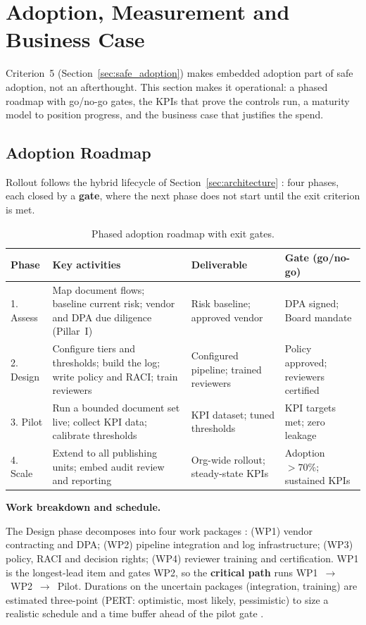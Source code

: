 \documentclass[12pt,a4paper]{article}
\begin{document}
\section{Adoption, Measurement and Business Case}
\label{sec:adoption}

Criterion~5 (Section~\ref{sec:safe_adoption}) makes embedded adoption part of safe adoption, not an afterthought. This section makes it operational: a phased roadmap with go/no-go gates, the KPIs that prove the controls run, a maturity model to position progress, and the business case that justifies the spend.

\subsection{Adoption Roadmap}

Rollout follows the hybrid lifecycle of Section~\ref{sec:architecture} \cite{falchi_slides}: four phases, each closed by a \textbf{gate}, where the next phase does not start until the exit criterion is met.

\begin{table}[H]
\centering
\small
{}
\begin{tabular}{@{} p{2.0cm} p{4.7cm} p{3.4cm} p{3.4cm} @{}}
\toprule
\textbf{\color{accentdark}Phase} & \textbf{\color{accentdark}Key activities} & \textbf{\color{accentdark}Deliverable} & \textbf{\color{accentdark}Gate (go/no-go)} \\
\midrule
1. Assess & Map document flows; baseline current risk; vendor and DPA due diligence (Pillar~I) & Risk baseline; approved vendor & DPA signed; Board mandate \\
2. Design & Configure tiers and thresholds; build the log; write policy and RACI; train reviewers & Configured pipeline; trained reviewers & Policy approved; reviewers certified \\
3. Pilot & Run a bounded document set live; collect KPI data; calibrate thresholds & KPI dataset; tuned thresholds & KPI targets met; zero leakage \\
4. Scale & Extend to all publishing units; embed audit review and reporting & Org-wide rollout; steady-state KPIs & Adoption $>70\%$; sustained KPIs \\
\bottomrule
\end{tabular}
\caption{Phased adoption roadmap with exit gates.}
\label{tab:roadmap}
\end{table}

\noindent\textbf{Work breakdown and schedule.}\par
The Design phase decomposes into four work packages \cite{falchi_slides}: (WP1) vendor contracting and DPA; (WP2) pipeline integration and log infrastructure; (WP3) policy, RACI and decision rights; (WP4) reviewer training and certification. WP1 is the longest-lead item and gates WP2, so the \textbf{critical path} runs WP1~$\to$~WP2~$\to$~Pilot. Durations on the uncertain packages (integration, training) are estimated three-point (PERT: optimistic, most likely, pessimistic) to size a realistic schedule and a time buffer ahead of the pilot gate \cite{falchi_slides}.
\end{document}
